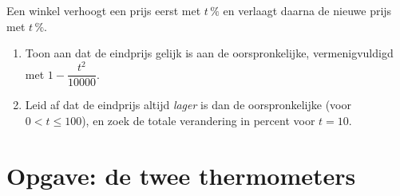 \begin{exercise}[$\star\star\star$]\label{exo:g9:linfunc:10}
Een winkel verhoogt een prijs eerst met $t\,\%$ en verlaagt daarna de nieuwe prijs
met $t\,\%$.
\begin{enumerate}
  \item Toon aan dat de eindprijs gelijk is aan de oorspronkelijke, vermenigvuldigd
        met $1 - \dfrac{t^2}{10000}$.
  \item Leid af dat de eindprijs altijd \emph{lager} is dan de oorspronkelijke
        (voor $0 < t \leq 100$), en zoek de totale verandering in percent voor
        $t = 10$.
\end{enumerate}
\end{exercise}

\section{Opgave: de twee thermometers}

